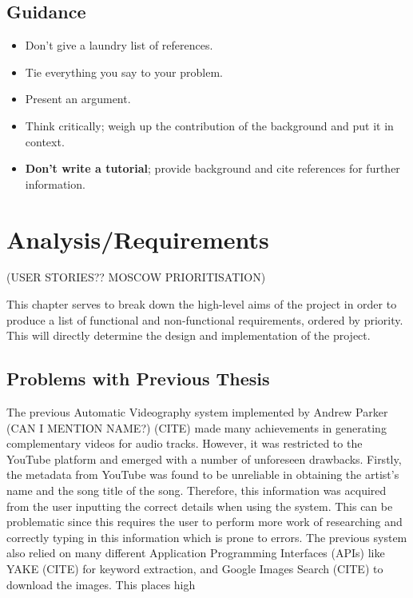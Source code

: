 \documentclass{l4proj}
\begin{document}
\section{Guidance}
\begin{itemize}    
    \item
      Don't give a laundry list of references.
    \item
      Tie everything you say to your problem.
    \item
      Present an argument.
    \item Think critically; weigh up the contribution of the background and put it in context.    
    \item
      \textbf{Don't write a tutorial}; provide background and cite
      references for further information.
\end{itemize}

\chapter{Analysis/Requirements}
(USER STORIES?? MOSCOW PRIORITISATION)

This chapter serves to break down the high-level aims of the project in order to produce a list of functional and non-functional requirements, ordered by priority. This will directly determine the design and implementation of the project.

\section{Problems with Previous Thesis}
The previous Automatic Videography system implemented by Andrew Parker (CAN I MENTION NAME?) (CITE) made many achievements in generating complementary videos for audio tracks. However, it was restricted to the YouTube platform and emerged with a number of unforeseen drawbacks. Firstly, the metadata from YouTube was found to be unreliable in obtaining the artist's name and the song title of the song. Therefore, this information was acquired from the user inputting the correct details when using the system. This can be problematic since this requires the user to perform more work of researching and correctly typing in this information which is prone to errors. The previous system also relied on many different Application Programming Interfaces (APIs) like YAKE (CITE) for keyword extraction, and Google Images Search (CITE) to download the images. This places high 
\end{document}
